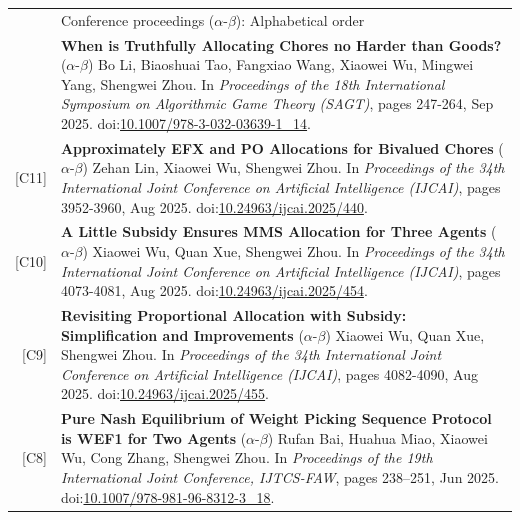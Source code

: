 \documentclass[letterpaper, 11pt]{article}
\newcommand{\headingfont}{\Large\color{OliveGreen}}
\newenvironment{SectionTable}[1]{
	\renewcommand*{\arraystretch}{1.2}
	\setlength{\tabcolsep}{10pt}
	\begin{longtable}{Rp{5.2in}} & #1 \\}
{\end{longtable}\vspace{-1cm}}
\begin{document}
\begin{SectionTable}{\headingfont Conference proceedings \; \small\color{black}  ($\alpha$-$\beta$): Alphabetical order}
[C12] & 
\textbf{When is Truthfully Allocating Chores no Harder than Goods?} \newline
($\alpha$-$\beta$) Bo Li, Biaoshuai Tao, Fangxiao Wang, Xiaowei Wu, Mingwei Yang, Shengwei Zhou. \newline
In \textit{Proceedings of the 18th International Symposium on Algorithmic Game Theory (SAGT)}, pages 247-264, Sep 2025. doi:\href{https://link.springer.com/chapter/10.1007/978-3-032-03639-1_14}{10.1007/978-3-032-03639-1\_14}. \\

[C11] & 
\textbf{Approximately EFX and PO Allocations for Bivalued Chores} \newline
($\alpha$-$\beta$) Zehan Lin, Xiaowei Wu, Shengwei Zhou. \newline
In \textit{Proceedings of the 34th International Joint Conference on Artificial Intelligence (IJCAI)}, pages 3952-3960, Aug 2025. doi:\href{https://doi.org/10.24963/ijcai.2025/440}{10.24963/ijcai.2025/440}.\\

[C10] & 
\textbf{A Little Subsidy Ensures MMS Allocation for Three Agents} \newline
($\alpha$-$\beta$) Xiaowei Wu, Quan Xue, Shengwei Zhou. \newline
In \textit{Proceedings of the 34th International Joint Conference on Artificial Intelligence (IJCAI)}, pages 4073-4081, Aug 2025. doi:\href{https://doi.org/10.24963/ijcai.2025/454}{10.24963/ijcai.2025/454}.\\

\hypertarget{OR-IJCAI25}{[C9]} & 
\textbf{Revisiting Proportional Allocation with Subsidy: Simplification and Improvements} \newline
($\alpha$-$\beta$) Xiaowei Wu, Quan Xue, Shengwei Zhou.  \newline
In \textit{Proceedings of the 34th International Joint Conference on Artificial Intelligence (IJCAI)}, pages 4082-4090, Aug 2025. doi:\href{https://doi.org/10.24963/ijcai.2025/455}{10.24963/ijcai.2025/455}. \\

[C8] & 
\textbf{Pure Nash Equilibrium of Weight Picking Sequence Protocol is WEF1 for Two Agents} \newline
($\alpha$-$\beta$) Rufan Bai, Huahua Miao, Xiaowei Wu, Cong Zhang, Shengwei Zhou.  \newline
In \textit{Proceedings of the 19th International Joint Conference, IJTCS-FAW}, pages 238–251, Jun 2025. doi:\href{https://link.springer.com/chapter/10.1007/978-981-96-8312-3_18}{10.1007/978-981-96-8312-3\_18}. \\


\end{SectionTable}
\end{document}
